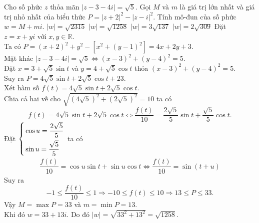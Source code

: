 \begin{ex}%
 Cho số phức $z$ thỏa mãn $| z - 3 - 4i| = \sqrt{5}$. Gọi $M$ và $m$ là giá trị lớn nhất và giá trị nhỏ nhất của biểu thức $P = |z + 2|^2 - |z - i|^2$. Tính mô-đun của số phức $w = M + mi$.
 \choice
  {$|w| = \sqrt{2315}$}
  {\True $|w| = \sqrt{1258}$}
  {$|w| = 3\sqrt{137}$}
  {$|w| = 2\sqrt{309}$}
 \loigiai
  {
  Đặt $z = x + yi$ với $x, y \in \mathbb{R}$.\\
  Ta có $P = (x + 2)^2 + y^2 - \left[ x^2 + (y - 1)^2 \right] = 4x + 2y + 3$.\\
  Mặt khác $| z - 3 - 4i| = \sqrt{5} \Leftrightarrow (x - 3)^2 + (y - 4)^2 = 5$.\\
  Đặt $x = 3 + \sqrt{5} \sin t$ và $y = 4 + \sqrt{5} \cos t$ thỏa $(x - 3)^2 + (y - 4)^2 = 5$.\\
  Suy ra $P = 4\sqrt{5} \sin t + 2\sqrt{5} \cos t + 23$.\\
  Xét hàm số $f(t) = 4\sqrt{5} \sin t + 2\sqrt{5} \cos t$.\\
  Chia cả hai vế cho $\sqrt{\left( 4\sqrt{5} \right)^2 + \left( 2\sqrt{5} \right)^2} = 10$ ta có\\
  $$f(t) = 4\sqrt{5} \sin t + 2\sqrt{5} \cos t \Leftrightarrow \dfrac{f(t)}{10} = \dfrac{2\sqrt{5}}{5} \sin t + \dfrac{\sqrt{5}}{5} \cos t.$$
  Đặt $\left\{\begin{aligned}& \cos u = \dfrac{2\sqrt{5}}{5} \\& \sin u = \dfrac{\sqrt{5}}{5}\end{aligned}\right.$ ta có
  \begin{align*}
   \dfrac{f(t)}{10} = \cos u \sin t + \sin u \cos t \Leftrightarrow \dfrac{f(t)}{10} = \sin (t + u)
  \end{align*}
  Suy ra
  $$-1 \leq \dfrac{f(t)}{10} \leq 1 \Rightarrow -10 \leq f(t) \leq 10 \Rightarrow 13 \leq P \leq 33.$$
  Vậy $M = \max P = 33$ và $m = \min P = 13$.\\
  Khi đó $w = 33 + 13i$. Do đó $|w| = \sqrt{33^2 + 13^2} = \sqrt{1258}$.
  }
\end{ex}


